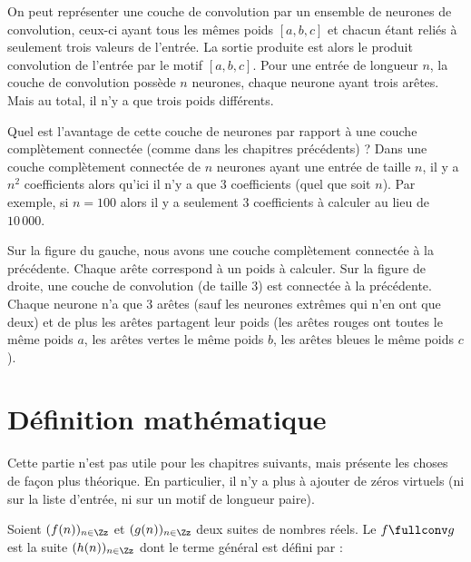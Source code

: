 \documentclass[11pt,class=report,crop=false]{standalone}
\begin{document}
On peut représenter une couche de convolution par un ensemble de neurones de convolution, 
ceux-ci ayant tous les mêmes poids $[a,b,c]$ et chacun étant reliés à seulement trois valeurs de l'entrée. La sortie produite est alors le produit  convolution de l'entrée par le motif $[a,b,c]$.
Pour une entrée de longueur $n$, la couche de convolution possède $n$ neurones, chaque neurone ayant trois arêtes. Mais au total, il n'y a que trois poids différents.



Quel est l'avantage de cette couche de neurones par rapport à une couche complètement connectée (comme dans les chapitres précédents) ?
Dans une couche complètement connectée de $n$ neurones ayant une entrée de taille $n$, il y a $n^2$ coefficients alors qu'ici il n'y a que $3$ coefficients (quel que soit $n$). Par exemple, si $n=100$ alors il y a seulement $3$ coefficients à calculer au lieu de $10\,000$.


Sur la figure du gauche, nous avons une couche complètement connectée à la précédente. Chaque arête correspond à un poids à calculer. Sur la figure de droite, une couche de convolution (de taille $3$) est connectée à la précédente.
Chaque neurone n'a que $3$ arêtes (sauf les neurones extrêmes qui n'en ont que deux) et de plus les arêtes partagent leur poids (les arêtes rouges ont toutes le même poids $a$, les arêtes vertes le même poids $b$, les arêtes bleues le même poids $c$).


\section{Définition mathématique}

Cette partie  n'est pas utile pour les chapitres suivants, mais présente les choses de façon plus théorique.
En particulier, il n'y a plus à ajouter de zéros virtuels (ni sur la liste d'entrée, ni sur un motif de longueur paire). 


\begin{definition}
Soient $(f(n))_{n\in\Zz}$ et $(g(n))_{n\in\Zz}$ deux suites de nombres réels.
Le  $f \fullconv g$ est la suite $(h(n))_{n\in\Zz}$ dont le terme général est défini par :
\end{definition}
\end{document}
